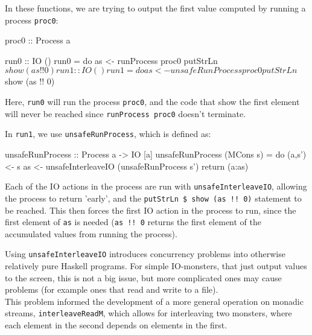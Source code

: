 \documentclass{article}
\begin{document}
In these functions, we are trying to output the first value computed by running a process \verb+proc0+:

\begin{haskell}
proc0 :: Process a

run0 :: IO ()
run0 = do as <- runProcess proc0
          putStrLn $ show (as !! 0)

run1 :: IO ()
run1 = do as <- unsafeRunProcess proc0
          putStrLn $ show (as !! 0)
\end{haskell}

Here, \verb+run0+ will run the process \verb+proc0+, and the code that show the first element will never be reached since \verb+runProcess proc0+ doesn't terminate.

In \verb+run1+, we use \verb+unsafeRunProcess+, which is defined as:

\begin{haskell}
unsafeRunProcess :: Process a -> IO [a]
unsafeRunProcess (MCons s) = 
	do (a,s') <- s
	   as     <- unsafeInterleaveIO (unsafeRunProcess s')
	   return (a:as)
\end{haskell}

Each of the IO actions in the process are run with \verb+unsafeInterleaveIO+, allowing the process to return 'early', and the \verb+putStrLn $ show (as !! 0)+ statement to be reached. This then forces the first IO action in the process to run, since the first element of \verb+as+ is needed (\verb+as !! 0+ returns the first element of the accumulated values from running the process).

Using \verb+unsafeInterleaveIO+ introduces concurrency problems into otherwise relatively pure Haskell programs. For simple IO-monsters, that just output values to the screen, this is not a big issue, but more complicated ones may cause problems (for example ones that read and write to a file). \\

This problem informed the development of a more general operation on monadic streams, \verb+interleaveReadM+, which allows for interleaving two monsters, where each element in the second depends on elements in the first.

\end{document}

